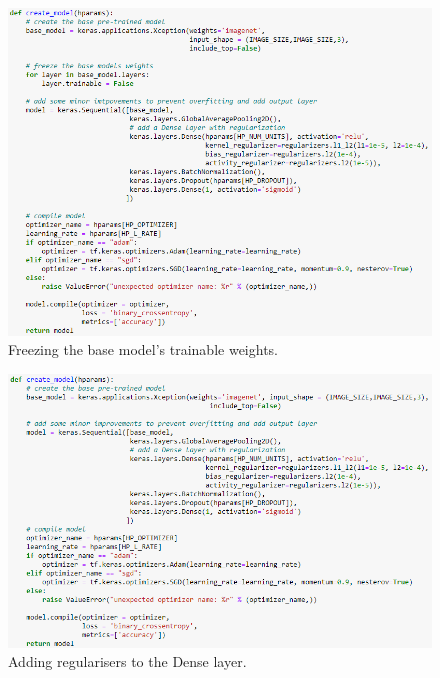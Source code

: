 \begin{figure}[H]
    \centering
    \includegraphics[width=\textwidth]{figures/xception-improvement-1.png}
    \caption{Freezing the base model's trainable weights.}
    \label{fig:xception-improvement-1}
\end{figure}
\begin{figure}[H]
    \centering
    \includegraphics[width=\textwidth]{figures/xception-improvement-2.png}
    \caption{Adding regularisers to the Dense layer.}
    \label{fig:xception-improvement-2}
\end{figure}
